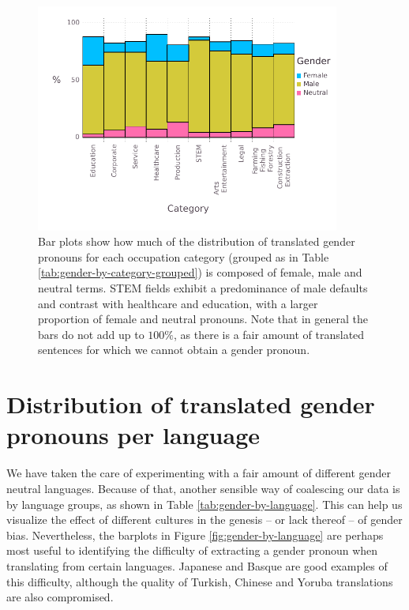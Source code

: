 \documentclass[fleqn,10pt]{article}
\begin{document}
\begin{figure}[H]
	\centering
	\includegraphics[width=10cm]{pictures/gender-by-category-grouped}
	\caption{Bar plots show how much of the distribution of translated gender pronouns for each occupation category (grouped as in Table \ref{tab:gender-by-category-grouped}) is composed of female, male and neutral terms. STEM fields exhibit a predominance of male defaults and contrast with healthcare and education, with a larger proportion of female and neutral pronouns. Note that in general the bars do not add up to $100\%$, as there is a fair amount of translated sentences for which we cannot obtain a gender pronoun.}
	\label{fig:gender-by-category}
\end{figure}

\section{Distribution of translated gender pronouns per language}

We have taken the care of experimenting with a fair amount of different gender neutral languages. Because of that, another sensible way of coalescing our data is by language groups, as shown in Table \ref{tab:gender-by-language}. This can help us visualize the effect of different cultures in the genesis -- or lack thereof -- of gender bias. Nevertheless, the barplots in Figure \ref{fig:gender-by-language} are perhaps most useful to identifying the difficulty of extracting a gender pronoun when translating from certain languages. Japanese and Basque are good examples of this difficulty, although the quality of Turkish, Chinese and Yoruba translations are also compromised.
\end{document}
